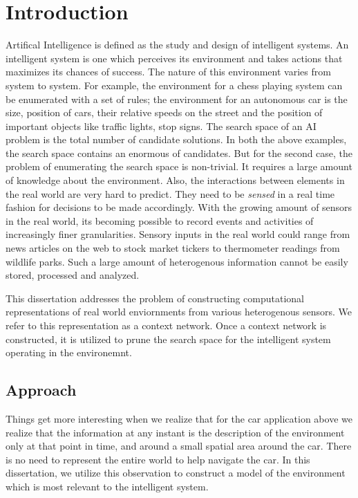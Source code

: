\chapter{Introduction}

Artifical Intelligence is defined as the study and design of intelligent systems. An intelligent system is one which perceives its environment and takes actions that maximizes its chances of success. The nature of this environment varies from system to system. For example, the environment for a chess playing system can be enumerated with a set of rules; the environment for an autonomous car is the size, position of cars, their relative speeds on the street and the position of important objects like traffic lights, stop signs. The search space of an AI problem is the total number of candidate solutions. In both the above examples, the search space contains an enormous of candidates. But for the second case, the problem of enumerating the search space is non-trivial. It requires a large amount of knowledge about the environment. Also, the interactions between elements in the real world are very hard to predict. They need to be \textit{sensed} in a real time fashion for decisions to be made accordingly. With the growing amount of sensors in the real world, its becoming possible to record events and activities of increasingly finer granularities. Sensory inputs in the real world could range from news articles on the web to stock market tickers to thermometer readings from wildlife parks. Such a large amount of heterogenous information cannot be easily stored, processed and analyzed. 

This dissertation addresses the problem of constructing computational representations of real world enviornments from various heterogenous sensors. We refer to this representation as a context network. Once a context network is constructed, it is utilized to prune the search space for the intelligent system operating in the environemnt.

\section{Approach}
Things get more interesting when we realize that for the car application above we realize that the information at any instant is the description of the environment only at that point in time, and around a small spatial area around the car. There is no need to represent the entire world to help navigate the car. In this dissertation, we utilize this observation to construct a model of the environment which is most relevant to the intelligent system.

